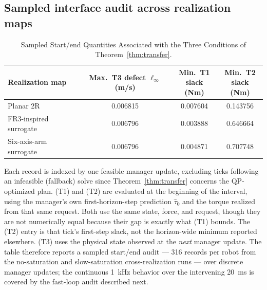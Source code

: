 \documentclass[journal]{IEEEtran}
\begin{document}
\subsection{Sampled interface audit across realization maps}
\label{sec:sampled}

\begin{table}[t]
\caption{Sampled Start/end Quantities Associated with the Three Conditions of Theorem~\ref{thm:transfer}.}
\label{tab:audit}
\centering
\footnotesize
\setlength{\tabcolsep}{3pt}
\begin{tabular}{@{}lccc@{}}
\toprule
Realization map & \shortstack{Max.\ T3 defect\\$\ell_\infty$ (m/s)} & \shortstack{Min.\ T1\\slack (Nm)} & \shortstack{Min.\ T2\\slack (Nm)} \\
\midrule
Planar 2R & 0.006815 & 0.007604 & 0.143756 \\
FR3-inspired surrogate & 0.006796 & 0.003888 & 0.646664 \\
Six-axis-arm surrogate & 0.006796 & 0.004871 & 0.707748 \\
\bottomrule
\end{tabular}
\end{table}

Each record is indexed by one feasible manager update, excluding ticks following an infeasible (fallback) solve since Theorem~\ref{thm:transfer} concerns the QP-optimized plan. (T1) and (T2) are evaluated at the beginning of the interval, using the manager's own first-horizon-step prediction $\hat\tau_0$ and the torque realized from that same request. Both use the same state, force, and request, though they are not numerically equal because their gap is exactly what (T1) bounds. The (T2) entry is that tick's first-step slack, not the horizon-wide minimum reported elsewhere. (T3) uses the physical state observed at the \emph{next} manager update. The table therefore reports a sampled start/end audit --- 316 records per robot from the no-saturation and slow-saturation cross-realization runs --- over discrete manager updates; the continuous 1~kHz behavior over the intervening 20~ms is covered by the fast-loop audit described next.
\end{document}
